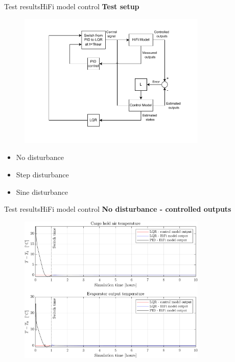 \begin{frame}{Test results}{HiFi model control}
	 \textbf{Test setup}
	 \begin{figure}[h!]
	 	\centering
	 	\includegraphics[width=0.8\textwidth]{../Graphics/HiFi_simulation_test_diagram.pdf}
	 	\label{fig:test_setup}
	 \end{figure}
 \begin{itemize}
 	\item No disturbance
 	\item Step disturbance
 	\item Sine disturbance
 \end{itemize}
\end{frame}


\begin{frame}{Test results}{HiFi model control}
	\textbf{No disturbance - controlled outputs}
	\begin{figure}[H]
		\centering
		\includegraphics[width=0.8\textwidth]{../Graphics/fig_LQRvsKresten_noDist.png}
	\end{figure} 
\end{frame}

